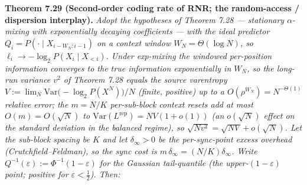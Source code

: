 \documentclass[
]{article}
\begin{document}
\textbf{Theorem 7.29 (Second-order coding rate of RNR; the random-access /
dispersion interplay).} \emph{Adopt the hypotheses of Theorem 7.28 ---
\emph{stationary $\alpha$-mixing with exponentially decaying coefficients} ---
with the ideal predictor $Q_i=P(\cdot\mid X_{i-W_N:i-1})$ on a context window
$W_N=\Theta(\log N)$, so $\ell_i\to-\log_2 P(X_i\mid X_{<i})$. Under exp-mixing
the windowed per-position information converges to the true information
exponentially in $W_N$, so the long-run variance $v^2$ of Theorem 7.28 equals
the source \emph{varentropy} $V:=\lim_N \mathrm{Var}\bigl(-\log_2 P(X^N)\bigr)/N$
(finite, positive) up to a $O(\rho^{W_N})=N^{-\Theta(1)}$ relative error; the
$m=N/K$ per-sub-block context resets add at most $O(m)=O(\sqrt N)$ to
$\mathrm{Var}(L^{\mathrm{rep}})=NV(1+o(1))$ (an $o(\sqrt N)$ effect on the
standard deviation in the balanced regime), so $\sqrt{N v^2}=\sqrt{N V}+
o(\sqrt N)$. Let the
sub-block spacing be $K$ and let $\delta_\infty>0$ be the per-sync-point excess
overhead (Crutchfield--Feldman), so the sync cost is $m\,\delta_\infty=
(N/K)\delta_\infty$. Write $Q^{-1}(\varepsilon):=\Phi^{-1}(1-\varepsilon)$ for the
Gaussian \emph{tail}-quantile (the upper-$(1{-}\varepsilon)$ point; positive for
$\varepsilon<\tfrac12$). Then:}
\end{document}
